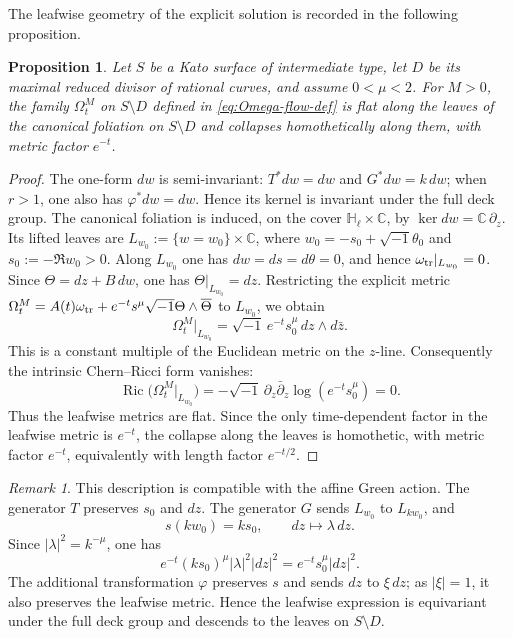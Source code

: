 \documentclass[12pt]{amsart}
\numberwithin{equation}{section}
\newtheorem{propo}{Proposition}
\theoremstyle{remark}
\newtheorem{remark}{Remark}
\theoremstyle{definition}
\begin{document}
The leafwise geometry of the explicit solution is recorded in the following proposition.
\begin{propo}
\label{prop:hyperbolic-leafwise-flatness}
Let $S$ be a Kato surface of intermediate type, let $D$ be its maximal reduced divisor of rational curves, and assume $0<\mu<2$. For $M>0$, the family $\Omega_t^M$ on $S\setminus D$ defined in \eqref{eq:Omega-flow-def} is flat along the leaves of the canonical foliation on $S\setminus D$ and collapses homothetically along them, with metric factor $e^{-t}$.
\end{propo}

\begin{proof}
The one-form $dw$ is semi-invariant: $T^*dw=dw$ and $G^*dw=k\,dw$; when $r>1$, one also has $\varphi^*dw=dw$. Hence its kernel is invariant under the full deck group. The canonical
foliation is induced, on the cover $\mathbb H_\ell\times\mathbb C$, by $\ker dw=\mathbb C\,\partial_z$. Its lifted leaves are $L_{w_0}:=\{w=w_0\}\times\mathbb C$, where $w_0=-s_0+\sqrt{-1}\theta_0$ and $s_0:=-\Re w_0>0$.
Along $L_{w_0}$ one has $dw=ds=d\theta=0$, and hence $\omega_{\rm tr}|_{L_{w_0}}=0$.
Since $\Theta=dz+B\,dw$, one has $\Theta|_{L_{w_0}}=dz$.
Restricting the explicit metric $\Omega_t^M = A(t)\omega_{\rm tr} + e^{-t}s^\mu\sqrt{-1}\Theta\wedge\overline{\Theta}$ to $L_{w_0}$, we obtain
$$
\Omega_t^M|_{L_{w_0}}
=
\sqrt{-1}\,e^{-t}s_0^\mu\,dz\wedge d\bar z.
$$
This is a constant multiple of the Euclidean metric on the $z$-line.
Consequently the intrinsic Chern--Ricci form vanishes:
$$
\operatorname{Ric}\bigl(\Omega_t^M|_{L_{w_0}}\bigr)
=
-\sqrt{-1}\,\partial_z\bar\partial_z
\log(e^{-t}s_0^\mu)
=
0.
$$
Thus the leafwise metrics are flat. Since the only time-dependent factor in
the leafwise metric is $e^{-t}$, the collapse along the leaves is homothetic,
with metric factor $e^{-t}$, equivalently with length factor $e^{-t/2}$.
\end{proof}

\begin{remark}
This description is compatible with the affine Green action. The generator $T$ preserves $s_0$ and $dz$. The generator $G$ sends $L_{w_0}$ to
$L_{kw_0}$, and
$$
s(kw_0)=ks_0,
\qquad
dz\longmapsto \lambda\,dz.
$$
Since $|\lambda|^2=k^{-\mu}$, one has
$$
e^{-t}(ks_0)^\mu|\lambda|^2|dz|^2
=
e^{-t}s_0^\mu|dz|^2.
$$
The additional transformation $\varphi$ preserves $s$ and sends $dz$ to $\xi\,dz$; as $|\xi|=1$, it also preserves the leafwise metric. Hence the leafwise expression is equivariant under the full deck group and descends to the leaves on $S\setminus D$.
\end{remark}
\end{document}
